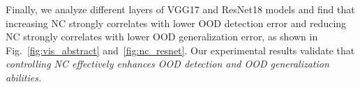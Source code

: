 Finally, we analyze different layers of VGG17 and ResNet18 models and find that increasing NC strongly correlates with lower OOD detection error and reducing NC strongly correlates with lower OOD generalization error, as shown in Fig.~\ref{fig:vis_abstract} and~\ref{fig:nc_resnet}.
Our experimental results validate that \emph{controlling NC effectively enhances OOD detection and OOD generalization abilities.} 




    


